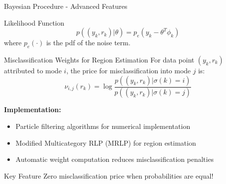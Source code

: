 \documentclass[aspectratio=169]{beamer}
\begin{document}
\begin{frame}{Bayesian Procedure - Advanced Features}
\begin{block}{Likelihood Function}
$$p((y_k, r_k) | \theta) = p_e(y_k - \theta^T \phi_k)$$
where $p_e(\cdot)$ is the pdf of the noise term.
\end{block}

\begin{block}{Misclassification Weights for Region Estimation}
For data point $(y_k, r_k)$ attributed to mode $i$, the price for misclassification into mode $j$ is:
$$\nu_{i,j}(r_k) = \log \frac{p((y_k, r_k) | \sigma(k) = i)}{p((y_k, r_k) | \sigma(k) = j)}$$
\end{block}

\textbf{Implementation:}
\begin{itemize}
\item Particle filtering algorithms for numerical implementation
\item Modified Multicategory RLP (MRLP) for region estimation
\item Automatic weight computation reduces misclassification penalties
\end{itemize}

\begin{alertblock}{Key Feature}
Zero misclassification price when probabilities are equal!
\end{alertblock}
\end{frame}
\end{document}
